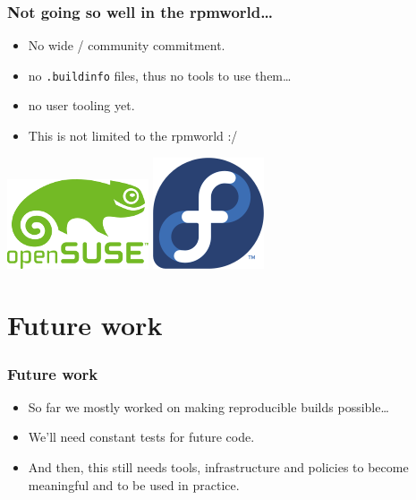 \documentclass[14pt,aspectratio=169]{beamer}
\begin{document}
\begin{frame}
 \frametitle{Not going so well in the rpmworld…}
 \begin{itemize}
	 \item No wide / community commitment.
	 \item<2-3> no \texttt{.buildinfo} files, thus no tools to use them…
	 \item<2-3> no user tooling yet.	 
	\item<3> This is not limited to the rpmworld :/
  \end{itemize}
 \begin{center}
  \includegraphics[height=0.1\paperheight]{images/openSUSE.png}
  \hspace{0.1\paperwidth}
 \includegraphics[height=0.1\paperheight]{images/fedora.png}
  \hspace{0.1\paperwidth}
 \end{center}

\end{frame}





\section{Future work}

\begin{frame}
 \frametitle{Future work}
 \begin{itemize}
 \item<1-3> So far we mostly worked on making reproducible builds possible…
 \item<2-3> We'll need constant tests for future code.
 \item<3> And then, this still needs tools, infrastructure and policies to become
 meaningful and to be used in practice.
 \end{itemize}
\end{frame}
\end{document}
